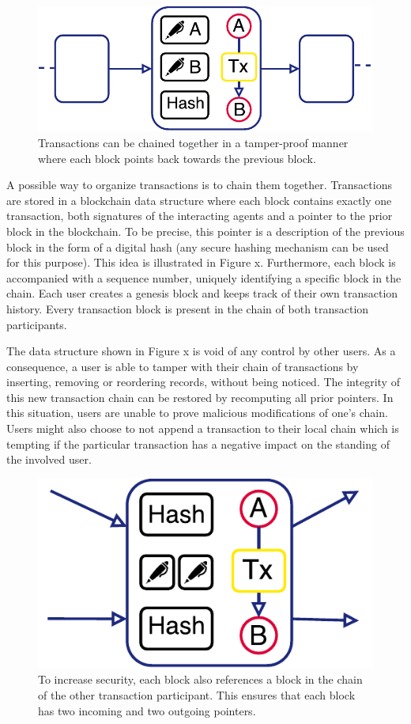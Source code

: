 \documentclass[USenglish]{article}
\begin{document}
\begin{figure}[h!]
	\centering
	\includegraphics[width=0.5\columnwidth]{assets/trustchain_tutorial_2}
	\caption{Transactions can be chained together in a tamper-proof manner where each block points back towards the previous block.}
	\label{fig:trustchain_tutorial_2}
\end{figure}

A possible way to organize transactions is to chain them together.
Transactions are stored in a blockchain data structure where each block contains exactly one transaction, both signatures of the interacting agents and a pointer to the prior block in the blockchain.
To be precise, this pointer is a description of the previous block in the form of a digital hash (any secure hashing mechanism can be used for this purpose).
This idea is illustrated in Figure x.
Furthermore, each block is accompanied with a sequence number, uniquely identifying a specific block in the chain.
Each user creates a genesis block and keeps track of their own transaction history.
Every transaction block is present in the chain of both transaction participants.

The data structure shown in Figure x is void of any control by other users. As a consequence, a user is able to tamper with their chain of transactions by inserting, removing or reordering records, without being noticed.
The integrity of this new transaction chain can be restored by recomputing all prior pointers.
In this situation, users are unable to prove malicious modifications of one's chain.
Users might also choose to not append a transaction to their local chain which is tempting if the particular transaction has a negative impact on the standing of the involved user.

\begin{figure}[h!]
	\centering
	\includegraphics[width=0.5\columnwidth]{assets/trustchain_tutorial_3}
	\caption{To increase security, each block also references a block in the chain of the other transaction participant. This ensures that each block has two incoming and two outgoing pointers.}
	\label{fig:trustchain_tutorial_3}
\end{figure}
\end{document}
